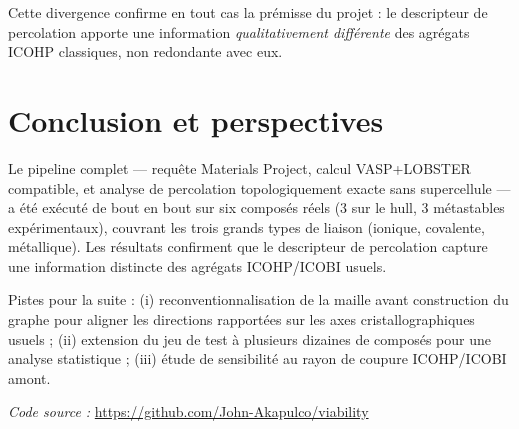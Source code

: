 \documentclass[11pt,a4paper]{article}
\begin{document}
Cette divergence confirme en tout cas la prémisse du projet : le descripteur
de percolation apporte une information \emph{qualitativement différente}
des agrégats ICOHP classiques, non redondante avec eux.

\section{Conclusion et perspectives}

Le pipeline complet --- requête Materials Project, calcul VASP+LOBSTER
compatible, et analyse de percolation topologiquement exacte sans
supercellule --- a été exécuté de bout en bout sur six composés réels
(3 sur le hull, 3 métastables expérimentaux), couvrant les trois grands
types de liaison (ionique, covalente, métallique). Les résultats confirment
que le descripteur de percolation capture une information distincte des
agrégats ICOHP/ICOBI usuels.

Pistes pour la suite : (i) reconventionnalisation de la maille avant
construction du graphe pour aligner les directions rapportées sur les axes
cristallographiques usuels ; (ii) extension du jeu de test à plusieurs
dizaines de composés pour une analyse statistique ; (iii) étude de
sensibilité au rayon de coupure ICOHP/ICOBI amont.

\vspace{1cm}
\noindent\textit{Code source :} \url{https://github.com/John-Akapulco/viability}
\end{document}
